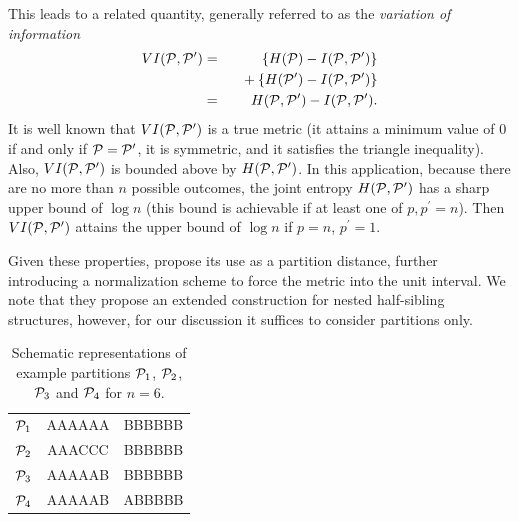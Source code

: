 \documentclass[twoside,10pt,twocolumn]{article}
\newcommand{\calp}{{\cal P}}
\begin{document}
This leads to a related quantity, generally referred to as the \emph{variation of information}
\begin{eqnarray*}
VI(\calp, \calp^\prime) & = & \{ H(\calp) - I(\calp, \calp^\prime) \}  \\
&\mbox{}& ~~ \mbox{}+  \{ H(\calp^\prime) - I(\calp, \calp^\prime) \} \\
& = & H(\calp, \calp^\prime) -  I(\calp, \calp^\prime).
\end{eqnarray*}
It is well known that  $VI(\calp, \calp^\prime)$ is a true metric (it attains a minimum value of 0 if and 
only if $\calp = \calp^\prime$, it is symmetric, and it satisfies the triangle inequality). Also, $VI(\calp, 
\calp^\prime)$ is bounded above by $H(\calp, \calp^\prime)$. In this application, because there are no more 
than $n$ possible outcomes, the joint entropy $H(\calp, \calp^\prime)$ has a sharp upper bound of $\log n$ 
(this bound is achievable if at least one of $p, p^\prime = n$). Then $VI(\calp, \calp^\prime)$ attains the 
upper bound of $\log n$ if $p = n$, $p^\prime = 1$. 




\chead[]{}
 

Given these properties, \citet{BrownDexter2012} propose its use as a partition distance, further introducing 
a normalization scheme to force the metric into the unit interval. We note that they propose an extended 
construction for nested half-sibling structures, however, for our discussion it suffices to consider 
partitions only. 


\begin{table}
\caption{Schematic representations of example partitions $\calp_1$, $\calp_2$, $\calp_3$ and $\calp_4$ for 
$n = 6$.}\label{pex.table}
\begin{center}
\begin{tabular}{r|c|c}\hline
$\calp_1$ &AAAAAA&BBBBBB \\
$\calp_2$ &AAACCC&BBBBBB \\
$\calp_3$ &AAAAAB&BBBBBB \\
$\calp_4$ &AAAAAB&ABBBBB 
\end{tabular}
\end{center}
\end{table}
\end{document}
